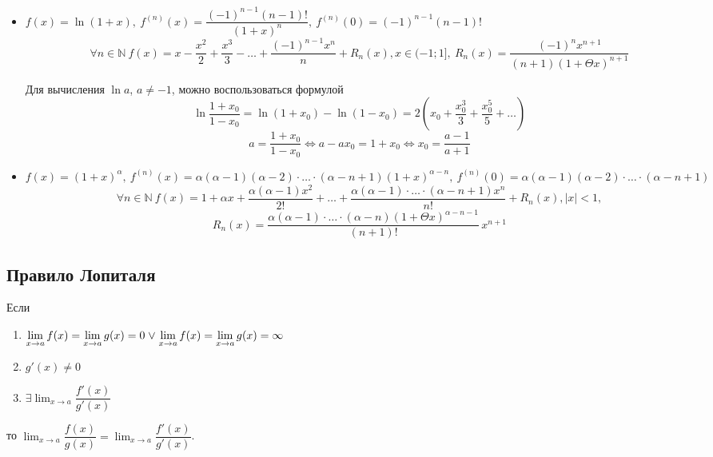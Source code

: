 \begin{itemize}
	\item $f(x) = \ln (1 + x), \
	f^{(n)}(x) = \dfrac{(-1)^{n-1} (n - 1)!}{(1 + x)^n}, \
	f^{(n)}(0) = (-1)^{n-1} (n - 1)!$
	\begin{equation*}
	\forall n \in \mathbb N \ f(x) = x - \frac{x^2}2 + \frac{x^3}3 - \ldots + \frac{(-1)^{n-1} x^n}n + R_n(x), x \in (-1; 1], \
	R_n(x) = \frac{(-1)^n x^{n+1}}{(n + 1)(1 + \Theta x)^{n+1}}
	\end{equation*}
	
	Для вычисления $\ln a$, $a \neq -1$, можно воспользоваться формулой
	\begin{equation*}
	\ln \frac{1 + x_0}{1 - x_0} = \ln (1 + x_0) - \ln (1 - x_0) =
	2 \left( x_0 + \frac{x_0^3}3 + \frac{x_0^5}5 + \ldots \right)
	\end{equation*}
	\begin{equation*}
	a = \frac{1 + x_0}{1 - x_0} \Leftrightarrow
	a - a x_0 = 1 + x_0 \Leftrightarrow
	x_0 = \frac{a - 1}{a + 1}
	\end{equation*}
	
	\item $f(x) = (1 + x)^\alpha, \
	f^{(n)}(x) = \alpha (\alpha - 1) (\alpha - 2) \cdot \ldots \cdot (\alpha - n + 1) (1 + x)^{\alpha - n}, \
	f^{(n)}(0) = \alpha (\alpha - 1) (\alpha - 2) \cdot \ldots \cdot (\alpha - n + 1)$
	\begin{equation*}
	\forall n \in \mathbb N \ f(x) = 1 + \alpha x + \frac{\alpha (\alpha - 1) x^2}{2!} + \ldots + \frac{\alpha (\alpha - 1) \cdot \ldots \cdot (\alpha - n + 1) x^n}{n!} + R_n(x), |x| < 1,
	\end{equation*}
	\begin{equation*}
	R_n(x) = \frac{\alpha (\alpha - 1) \cdot \ldots \cdot (\alpha - n) (1 + \Theta x)^{\alpha-n-1}}{(n + 1)!}\,x^{n+1}
	\end{equation*}
\end{itemize}

\subsection{Правило Лопиталя}
\begin{theorem}[правило Лопиталя]
Если
\begin{enumerate}
	\item $\displaystyle \lim_{x \to a} f(x) = \lim_{x \to a} g(x) = 0 \mathrel{\lor}
	\lim_{x \to a} f(x) = \lim_{x \to a} g(x) = \infty$
	\item $g'(x) \neq 0$
	\item $\displaystyle \exists \lim_{x \to a} \dfrac{f'(x)}{g'(x)}$	
\end{enumerate}
то $\displaystyle \lim_{x \to a} \dfrac{f(x)}{g(x)} = \lim_{x \to a} \dfrac{f'(x)}{g'(x)}$.
\end{theorem}

